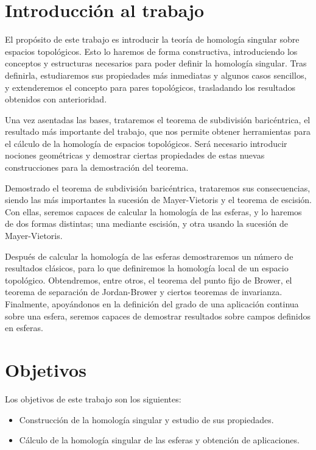 \label{ch:introduccionHOM}

\section{Introducción al trabajo}

El propósito de este trabajo es introducir la teoría de homología singular sobre
espacios topológicos. Esto lo haremos de forma constructiva, introduciendo los conceptos
y estructuras necesarios para poder definir la homología singular.
Tras definirla, estudiaremos sus propiedades más inmediatas y algunos casos sencillos,
y extenderemos el concepto para pares topológicos, trasladando los resultados obtenidos
con anterioridad.

Una vez asentadas las bases, trataremos el teorema de subdivisión baricéntrica, el
resultado más importante del trabajo, que nos permite obtener herramientas para el
cálculo de la homología de espacios topológicos. Será necesario introducir nociones
geométricas y demostrar ciertas propiedades de estas nuevas construcciones para la
demostración del teorema.

Demostrado el teorema de subdivisión baricéntrica, trataremos sus consecuencias,
siendo las más importantes la sucesión de Mayer-Vietoris y el teorema de escisión.
Con ellas, seremos capaces de calcular la homología de las esferas, y lo haremos
de dos formas distintas; una mediante escisión, y otra usando la sucesión de Mayer-Vietoris.

Después de calcular la homología de las esferas demostraremos un número de resultados clásicos,
para lo que definiremos la homología local de un espacio topológico. Obtendremos, entre otros,
el teorema del punto fijo de Brower, el teorema de separación de Jordan-Brower y
ciertos teoremas de invarianza. Finalmente, apoyándonos en la definición del grado de
una aplicación continua sobre una esfera, seremos capaces de demostrar resultados
sobre campos definidos en esferas.

\section{Objetivos}
Los objetivos de este trabajo son los siguientes:

\begin{itemize}
  \item Construcción de la homología singular y estudio de sus propiedades.

  \item Cálculo de la homología singular de las esferas y obtención de aplicaciones.

\end{itemize}

